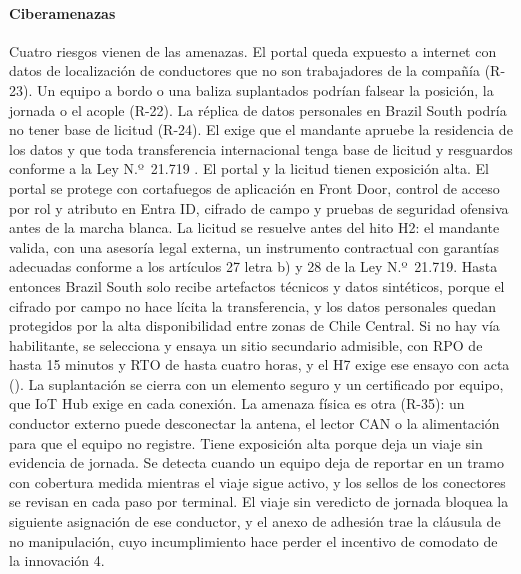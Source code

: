\paragraph{Ciberamenazas}
Cuatro riesgos vienen de las amenazas. El portal queda expuesto a internet con datos de localización de
conductores que no son trabajadores de la compañía (R-23). Un equipo a bordo o una baliza suplantados
podrían falsear la posición, la jornada o el acople (R-22). La réplica de datos personales en Brazil
South podría no tener base de licitud (R-24). El  exige que el mandante apruebe la residencia
de los datos y que toda transferencia internacional tenga base de licitud y resguardos conforme a la Ley
N.º~21.719 \parencite{ley21719}. El portal y la licitud tienen exposición alta. El portal se protege con
cortafuegos de aplicación en Front Door, control de acceso por rol y atributo en Entra ID, cifrado de
campo y pruebas de seguridad ofensiva antes de la marcha blanca. La licitud se resuelve antes del hito
H2: el mandante valida, con una asesoría legal externa, un instrumento contractual con garantías
adecuadas conforme a los artículos 27 letra b) y 28 de la Ley N.º~21.719. Hasta entonces Brazil South
solo recibe artefactos técnicos y datos sintéticos, porque el cifrado por campo no hace lícita la
transferencia, y los datos personales quedan protegidos por la alta disponibilidad entre zonas de Chile
Central. Si no hay vía habilitante, se selecciona y ensaya un sitio secundario admisible, con RPO de
hasta 15 minutos y RTO de hasta cuatro horas, y el H7 exige ese ensayo con acta
(). La suplantación se cierra con
un elemento seguro y un certificado por equipo, que IoT Hub exige en cada conexión. La amenaza física es
otra (R-35): un conductor externo puede desconectar la antena, el lector CAN o la alimentación para que
el equipo no registre. Tiene exposición alta porque deja un viaje sin evidencia de jornada. Se detecta
cuando un equipo deja de reportar en un tramo con cobertura medida mientras el viaje sigue activo, y los
sellos de los conectores se revisan en cada paso por terminal. El viaje sin veredicto de jornada bloquea
la siguiente asignación de ese conductor, y el anexo de adhesión trae la cláusula de no manipulación,
cuyo incumplimiento hace perder el incentivo de comodato de la innovación 4.


